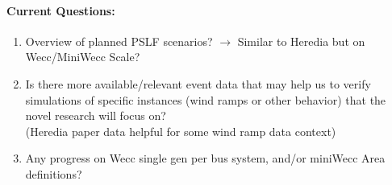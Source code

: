 \documentclass[12pt]{article}
\begin{document}
	\paragraph{Current Questions:}
	\begin{enumerate}
		
		
		\item Overview of planned PSLF scenarios? $\rightarrow$ Similar to Heredia but on Wecc/MiniWecc Scale?
		
		\item Is there more available/relevant event data that may help us to verify simulations of specific instances (wind ramps or other behavior) that the novel research will focus on?\\ (Heredia paper data helpful for some wind ramp data context)

		\item Any progress on Wecc single gen per bus system, and/or miniWecc Area definitions?
	\end{enumerate}

\end{document}
